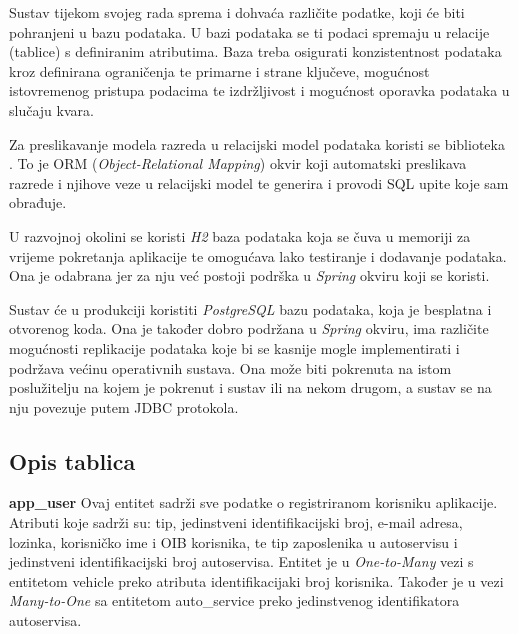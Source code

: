 %			

		Sustav tijekom svojeg rada sprema i dohvaća različite podatke, koji će biti pohranjeni u bazu podataka. U bazi podataka se ti podaci spremaju u relacije (tablice) s definiranim atributima. Baza treba osigurati konzistentnost podataka kroz definirana ograničenja te primarne i strane ključeve, mogućnost istovremenog pristupa podacima te izdržljivost i mogućnost oporavka podataka u slučaju kvara.
		
		Za preslikavanje modela razreda u relacijski model podataka koristi se biblioteka . To je ORM (\textit{Object-Relational Mapping}) okvir koji automatski preslikava razrede i njihove veze u relacijski model te generira i provodi SQL upite koje sam obrađuje.
		
		U razvojnoj okolini se koristi \textit{H2} baza podataka koja se čuva u memoriji za vrijeme pokretanja aplikacije te omogućava lako testiranje i dodavanje podataka. Ona je odabrana jer za nju već postoji podrška u \textit{Spring} okviru koji se koristi.
		
		Sustav će u produkciji koristiti \textit{PostgreSQL} bazu podataka, koja je besplatna i otvorenog koda. Ona je također dobro podržana u \textit{Spring} okviru, ima različite mogućnosti replikacije podataka koje bi se kasnije mogle implementirati i podržava većinu operativnih sustava. Ona može biti pokrenuta na istom poslužitelju na kojem je pokrenut i sustav ili na nekom drugom, a sustav se na nju povezuje putem JDBC protokola.
		
		
		
			\subsection{Opis tablica}
			

				
				\textbf{app\_user} Ovaj entitet sadrži sve podatke o registriranom korisniku aplikacije. Atributi koje sadrži su: tip, jedinstveni identifikacijski broj, e-mail adresa, lozinka, korisničko ime i OIB korisnika, te tip zaposlenika u autoservisu i jedinstveni identifikacijski broj autoservisa. Entitet je u \textit{One-to-Many} vezi s entitetom vehicle preko atributa identifikacijaki broj korisnika. Također je u vezi \textit{Many-to-One} sa entitetom auto\_service preko jedinstvenog identifikatora autoservisa.
				
